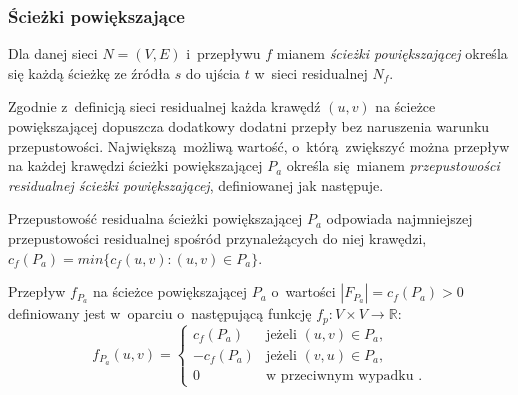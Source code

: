 \subsubsection{\textbf{Ścieżki powiększające}}
\par{
  \begin{definition}
    Dla danej sieci $N=(V,E)$ i~przepływu $f$ mianem \emph{ścieżki powiększającej} określa się każdą ścieżkę ze źródła $s$ do ujścia $t$ w~sieci residualnej $N_f$.
  \end{definition}
  Zgodnie z~definicją sieci residualnej każda krawędź $(u, v)$ na ścieżce powiększającej dopuszcza dodatkowy dodatni przepły bez naruszenia warunku przepustowości.
  Największą możliwą wartość, o~którą zwiększyć można przepływ na każdej krawędzi ścieżki powiększającej $P_a$ określa się mianem \emph{przepustowości residualnej ścieżki powiększającej}, definiowanej jak następuje.
  \begin{definition}
    Przepustowość residualna ścieżki powiększającej $P_a$ odpowiada najmniejszej przepustowości residualnej spośród przynależących do niej krawędzi, $c_f(P_a) = min\{c_f(u, v):(u, v)\in P_a\}$.
  \end{definition}
  \begin{definition}
    Przepływ $f_{P_a}$ na ścieżce powiększającej $P_a$ o~wartości $|F_{P_a}| = c_f(P_a) > 0$ definiowany jest w~oparciu o~następującą funkcję $f_p: V \times V \rightarrow \mathbb{R}$: 
    \begin{equation*}
    f_{P_a}(u, v) = \left\{
    \begin{array}{rl}
    c_f(P_a) & \text{jeżeli } (u, v) \in P_a,\\
    -c_f(P_a) & \text{jeżeli } (v, u) \in P_a,\\
    0 & \text{w przeciwnym wypadku }.
    \end{array} \right.
    \end{equation*}
  \end{definition}
}
